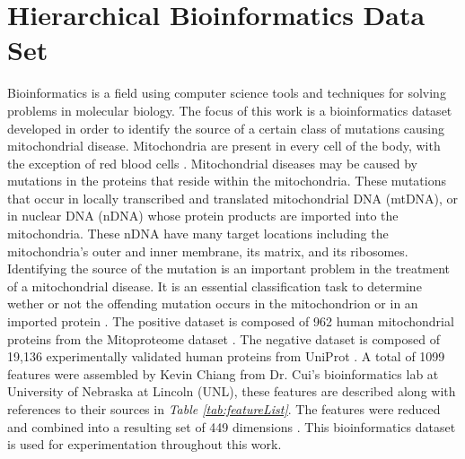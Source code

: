 \documentclass[ms]{nuthesis}
\begin{document}
\section{Hierarchical Bioinformatics Data Set}
\par Bioinformatics is a field using computer science tools and techniques
for solving problems in molecular biology. The focus of this work is
a bioinformatics dataset developed in order to identify the source of
a certain class of mutations causing mitochondrial disease. Mitochondria are
present in every cell of the body, with the exception of red blood cells
\cite{bioPoster}. Mitochondrial diseases may be caused by mutations
in the proteins that reside within the mitochondria. These mutations that
occur in locally transcribed and translated mitochondrial DNA (mtDNA), or
in nuclear DNA (nDNA) whose protein products are imported into the
mitochondria. These nDNA have many target locations including the mitochondria's
outer and inner membrane, its matrix, and its ribosomes. Identifying the
source of the mutation is an important problem in the treatment of a
mitochondrial disease. It is an essential classification task to determine
wether or not the offending mutation occurs in the mitochondrion or in
an imported protein \cite{bioPoster}. The positive dataset is composed of 962
human mitochondrial proteins from the Mitoproteome dataset \cite{mitoproteome}.
The negative dataset is composed of 19,136 experimentally validated human
 proteins from UniProt \cite{UniProt}. A total of 1099 features were assembled
 by Kevin Chiang from Dr. Cui's bioinformatics lab at University of Nebraska
 at Lincoln (UNL), these features are described along with references to their
 sources in \textit{Table \ref{tab:featureList}}. The features were reduced and
  combined into a resulting set of 449 dimensions \cite{bioPoster}. This
  bioinformatics dataset is used for experimentation throughout this work.
\end{document}
